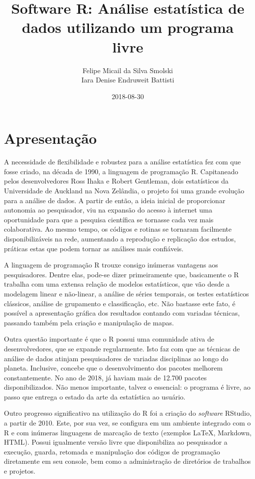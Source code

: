 \documentclass[12pt,brazil,oneside]{book}
\title{Software R: Análise estatística de dados utilizando um programa livre}
\author{Felipe Micail da Silva Smolski \\ Iara Denise Endruweit Battisti}
\date{2018-08-30}
\begin{document}
\maketitle

{
\setcounter{tocdepth}{1}
\tableofcontents
}
\hypertarget{apresentacao}{%
\chapter*{Apresentação}\label{apresentacao}}

A necessidade de flexibilidade e robustez para a análise estatística fez
com que fosse criado, na década de 1990, a linguagem de programação R.
Capitaneado pelos desenvolvedores Ross Ihaka e Robert Gentleman, dois
estatísticos da Universidade de Auckland na Nova Zelândia, o projeto foi
uma grande evolução para a análise de dados. A partir de então, a ideia
inicial de proporcionar autonomia ao pesquisador, viu na expansão do
acesso à internet uma oportunidade para que a pesquisa científica se
tornasse cada vez mais colaborativa. Ao mesmo tempo, os códigos e
rotinas se tornaram facilmente disponibilizáveis na rede, aumentando a
reprodução e replicação dos estudos, práticas estas que podem tornar as
análises mais confiáveis.

A linguagem de programação R trouxe consigo inúmeras vantagens aos
pesquisadores. Dentre elas, pode-se dizer primeiramente que, basicamente
o R trabalha com uma extensa relação de modelos estatísticos, que vão
desde a modelagem linear e não-linear, a análise de séries temporais, os
testes estatísticos clássicos, análise de grupamento e classificação,
etc. Não bastasse este fato, é possível a apresentação gráfica dos
resultados contando com variadas técnicas, passando também pela criação
e manipulação de mapas.

Outra questão importante é que o R possui uma comunidade ativa de
desenvolvedores, que se expande regularmente. Isto faz com que as
técnicas de análise de dados atinjam pesquisadores de variadas
disciplinas ao longo do planeta. Inclusive, concebe que o
desenvolvimento dos pacotes melhorem constantemente. No ano de 2018, já
haviam mais de 12.700 pacotes disponibilizados. Não menos importante,
talvez o essencial: o programa é livre, ao passo que entrega o estado da
arte da estatística ao usuário.

Outro progresso significativo na utilização do R foi a criação do
\emph{software} RStudio, a partir de 2010. Este, por sua vez, se
configura em um ambiente integrado com o R e com inúmeras linguagens de
marcação de texto (exemplos LaTeX, Markdown, HTML). Possui igualmente
versão livre que disponibiliza ao pesquisador a execução, guarda,
retomada e manipulação dos códigos de programação diretamente em seu
console, bem como a administração de diretórios de trabalhos e projetos.
\end{document}
